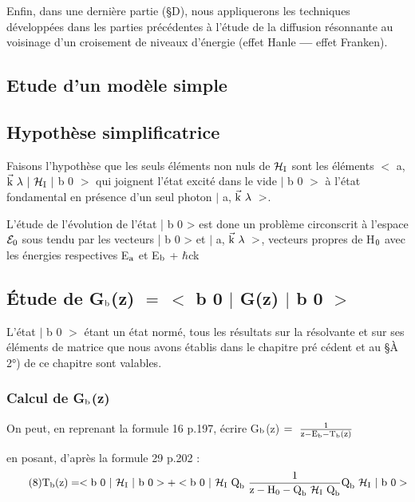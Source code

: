 Enfin, dans une dernière partie (\S D), nous appliquerons les
techniques développées dans les parties précédentes à l'étude de la diffusion
résonnante au voisinage d'un croisement de niveaux d'énergie (effet Hanle {\bf —}
effet Franken).

\subsection{Etude d'un modèle simple}%

\subsection{Hypothèse simplificatrice}%

Faisons l'hypothèse que les seuls éléments non nuls de $\mathcal{H}_{\text{I}}$ sont
les éléments $<$ a, $\vec{\mt{k}}\ \lambda\ |\ \mc{H}_\mt{I}\ |$ b 0 $>$ qui joignent l'état excité dans le vide
$|$ b 0 $>$ à l'état fondamental en présence d'un seul photon $|$ a, $\vec{\text{k}}\ \lambda\ >$.

L'étude de l'évolution de l'état | b 0 > est done un problème circonscrit à l'espace $\mathcal{E}_{\text{0}}$ sous tendu par les vecteurs | b 0 > et $|$ a, $\vec{\text{k}}\ \lambda\ >$, vecteurs propres de H$_{\text{0}}$ avec les énergies respectives E$_{\text{a}}$ et E$_{\text{b}}$ + $\hbar$ck

\subsection{Étude de G$_{\text{b}}$(z) $=\ <$ b 0 $|$ G(z) $|$ b 0 $>$}%

L'état $|$ b 0 $>$ étant un état normé, tous les résultats sur la résolvante et sur ses éléments de matrice que nous avons établis dans le chapitre pré
cédent et au \S À 2°) de ce chapitre sont valables.

\subsubsection{Calcul de G$_{\text{b}}$(z)}%

On peut, en reprenant la formule 16 p.197, écrire G$_{\text{b}}$(z) $=\ \frac{1}{\mt{z}-\mt{E}_\mt{b}-\mt{T}_\mt{b}\mt{(z)}}$

en posant, d'après la formule 29 p.202 :
\[
\tag{8} \mt{T}_\mt{b}\mt{(z)} = < \mt{b 0 } |\ \mc{H}_\mt{I}\ |\mt{ b 0}> +
< \mt{b 0 } |\ \mc{H}_\mt{I}\ \mt{Q}_\mt{b}\ 
\frac{1}{\mt{z}-\mt{H}_0-\mt{Q}_\mt{b}\ \mc{H}_\mt{I}\ \mt{Q}_\mt{b}}
\mt{Q}_\mt{b}\ \mc{H}_\mt{I}\ |\mt{ b 0}>
\]

